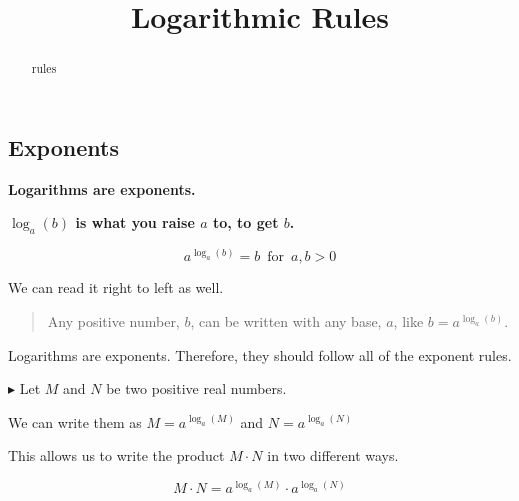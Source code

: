 \documentclass{ximera}
\title{Logarithmic Rules}
\begin{document}
\begin{abstract}
rules
\end{abstract}
\maketitle
















\subsection*{Exponents}



\begin{center}
\textbf{\textcolor{red!70!darkgray}{Logarithms are exponents.}}
\end{center}


\begin{center}
\textbf{\textcolor{red!75!green}{$\log_a(b)$ is what you \textbf{\textcolor{red!70!darkgray}{raise}} $a$ to, to get $b$.}} 

\[    a^{\log_a(b)}  = b    \, \text{ for } \,  a,b > 0     \]

\end{center}







We can read it right to left as well.  


\begin{quote}
Any positive number, $b$, can be written with any base, $a$, like $b = a^{\log_a(b)}$.
\end{quote}



Logarithms are exponents. Therefore, they should follow all of the exponent rules. 



$\blacktriangleright$  Let $M$ and $N$ be two positive real numbers.

We can write them as $M = a^{\log_a(M)}$ and $N = a^{\log_a(N)}$


This allows us to write the product $M \cdot N$ in two different ways.



\[   M \cdot N = a^{\log_a(M)} \cdot a^{\log_a(N)}                    \]
\end{document}
